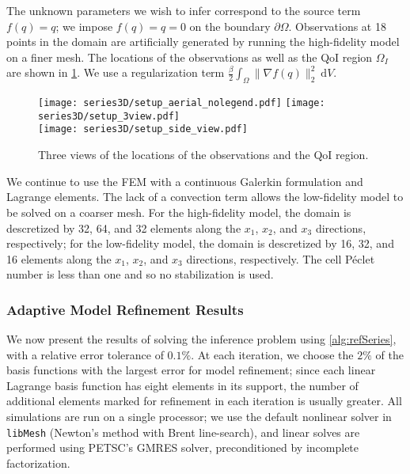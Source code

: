 The unknown parameters we wish to infer correspond to the source term $f(q)=q$; we impose $f(q)=q=0$ on the boundary $\partial\Omega$. Observations at 18 points in the domain are artificially generated by running the high-fidelity model on a finer mesh. The locations of the observations as well as the QoI region $\Omega_I$ are shown in \cref{fig:setup3D}. We use a regularization term $\frac{\beta}{2}\int_\Omega \|\nabla f(q)\|_2^2\:\textrm{d}V$.
%
\begin{figure}[htbp]
\centering
\texttt{[image: series3D/setup\_aerial\_nolegend.pdf]} \hfill
\texttt{[image: series3D/setup\_3view.pdf]} \\ 
\vspace{\baselineskip}
\texttt{[image: series3D/setup\_side\_view.pdf]}
\caption{Three views of the locations of the observations and the QoI region.}
\label{fig:setup3D}
\end{figure}
%

We continue to use the FEM with a continuous Galerkin formulation and Lagrange elements. The lack of a convection term allows the low-fidelity model to be solved on a coarser mesh. For the high-fidelity model, the domain is descretized by 32, 64, and 32 elements along the $x_1$, $x_2$, and $x_3$ directions, respectively; for the low-fidelity model, the domain is descretized by 16, 32, and 16 elements along the $x_1$, $x_2$, and $x_3$ directions, respectively. The cell P\'{e}clet number is less than one and so no stabilization is used.

\subsubsection{Adaptive Model Refinement Results} \label{sec:ref3D_diffmesh}

We now present the results of solving the inference problem using \cref{alg:refSeries}, with a relative error tolerance of $0.1\%$. At each iteration, we choose the $2\%$ of the basis functions with the largest error for model refinement; since each linear Lagrange basis function has eight elements in its support, the number of additional elements marked for refinement in each iteration is usually greater. All simulations are run on a single processor; we use the default nonlinear solver in \texttt{libMesh} (Newton's method with Brent line-search), and linear solves are performed using PETSC's GMRES solver, preconditioned by incomplete factorization. 

